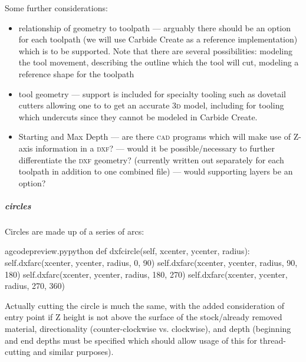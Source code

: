 \documentclass{ltxdoc}
\begin{document}
 
Some further considerations:

\begin{itemize}
 \item relationship of geometry to toolpath --- arguably there should be an option for each
       toolpath (we will use Carbide Create as a reference implementation) which is to be 
       supported. Note that there are several possibilities: modeling the tool movement, 
       describing the outline which the tool will cut, modeling a reference shape for the toolpath
 \item tool geometry --- support is included for specialty tooling 
       such as dovetail cutters allowing one to to get an accurate \textsc{3d} model, including for tooling which
       undercuts since they cannot be modeled in Carbide Create.
 \item Starting and Max Depth --- are there \textsc{cad} programs which will make use of Z-axis information 
       in a \textsc{dxf}? --- would it be possible/necessary to further differentiate the \textsc{dxf} geometry?
       (currently  written out separately for each toolpath in addition to one combined file) --- would supporting layers be an option?
\end{itemize}

\subparagraph{circles}

Circles are made up of a series of arcs:

\lstset{firstnumber=\thegcpy}
\begin{writecode}{a}{gcodepreview.py}{python}
    def dxfcircle(self, xcenter, ycenter, radius):
        self.dxfarc(xcenter, ycenter, radius,  0, 90)
        self.dxfarc(xcenter, ycenter, radius, 90, 180)
        self.dxfarc(xcenter, ycenter, radius, 180, 270)
        self.dxfarc(xcenter, ycenter, radius, 270, 360)

\end{writecode}
\addtocounter{gcpy}{6}

Actually cutting the circle is much the same, with the added consideration of entry point if Z height is not above the surface of the stock/already removed material, directionality (counter-clockwise vs. clockwise), and depth (beginning and end depths must be specified which should allow usage of this for thread-cutting and similar purposes).
\end{document}
